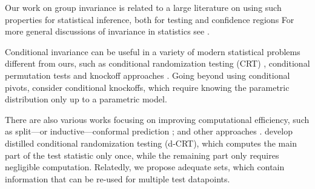 \documentclass[english]{article}
\begin{document}
Our work on group invariance is related to a large literature on using such properties for statistical inference, both for testing and confidence regions \citep[e.g.,][etc]{eden1933validity,fisher1935design,
lehmann1949theory,hoeffding1952large,dwass1957modified,hemerik2018exact,freedman1983nonstochastic,
david2008beginnings,berry2014chronicle,
hemerik2020permutation,dobriban2022consistency}
 For more general discussions of invariance in statistics see \cite{eaton1989group,wijsman1990invariant,giri1996group}. 

Conditional invariance can be useful in a variety of modern statistical problems different from ours, 
such as conditional randomization testing (CRT) \protect\citep[e.g.,][]{candes2018panning,huang2020relaxing,katsevich2020power,liu2022fast},
conditional permutation tests 
\citep{berrett2020conditional}
and knockoff approaches \protect\citep[e.g.,][etc]{barber2015controlling}.
Going beyond using conditional pivots,  \cite{huang2020relaxing} consider conditional knockoffs,
which require knowing the parametric distribution only up to a parametric model. 

There are also various 
works focusing on improving computational efficiency, such as  
split---or inductive---conformal prediction \citep{papadopoulos2002inductive}; 
and other approaches 
\citep{vovk2022algorithmic,lei2019fast,cherubin2021exact}.
\cite{liu2022fast} develop distilled conditional randomization testing (d-CRT), which computes the main part of the test statistic only once, 
while the remaining part only requires negligible computation. 
Relatedly, we propose adequate sets, which contain information that can be re-used for multiple test datapoints. 




\end{document}
